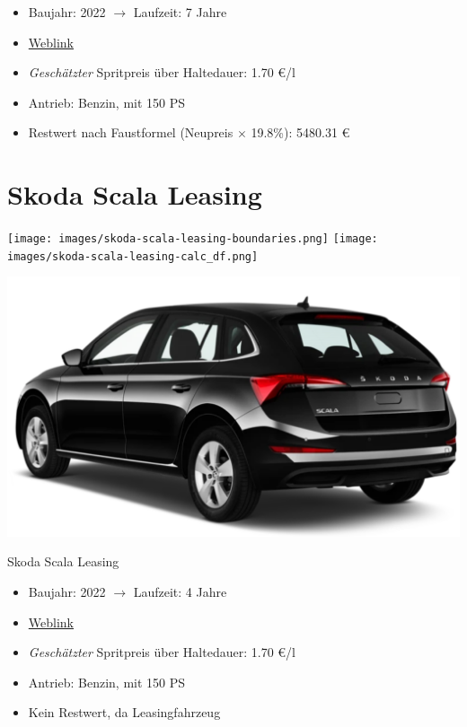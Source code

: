 \documentclass[landscape, DIV=99, 14pt]{scrartcl}
\begin{document}
\begin{itemize}
    \item Baujahr: 2022 $\rightarrow$ Laufzeit: 7 Jahre
    \item \href{https://konfigurator.meinauto.de/skoda/neuwagen/scala/angebote/scala-tour/konfigurator/\#!/preisvergleich/tour/8868635/7,35,37,46/private/109429--291462/5217/61e95cad08f55/cash-purchase/109433--291466/48,0,10000,0,0,0,0,0,}{Weblink}
    \item \emph{Gesch\"atzter} Spritpreis \"uber Haltedauer: 1.70 \euro{}/l
    \item Antrieb: Benzin, mit 150 PS
    \item Restwert nach Faustformel (Neupreis $\times$ 19.8\%): 5480.31 \euro{}
\end{itemize}

\pagebreak


\twocolumn

\section*{Skoda Scala Leasing}
\begin{center}
\texttt{[image: images/skoda-scala-leasing-boundaries.png]}
\null
\vspace{0.5cm}
\texttt{[image: images/skoda-scala-leasing-calc\_df.png]}
\end{center}

\pagebreak
\null
\vspace{2cm}
\begin{center}
\includegraphics[width=0.9\columnwidth]{cars/skoda-scala-leasing.png}

Skoda Scala Leasing
\end{center}

\begin{itemize}
    \item Baujahr: 2022 $\rightarrow$ Laufzeit: 4 Jahre
    \item \href{https://konfigurator.meinauto.de/skoda/neuwagen/scala/angebote/scala-tour/konfigurator/\#!/preisvergleich/tour/8868635/7,35,37,46/private/109429--291462/5217/61e95cad08f55/leasing/109433--291466/36,3000,15000,0,0,0,0,0,}{Weblink}
    \item \emph{Gesch\"atzter} Spritpreis \"uber Haltedauer: 1.70 \euro{}/l
    \item Antrieb: Benzin, mit 150 PS
    \item Kein Restwert, da Leasingfahrzeug
\end{itemize}
\end{document}
